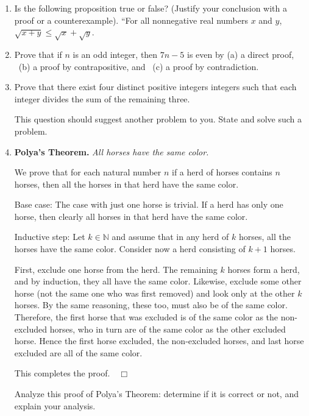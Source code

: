 \documentclass[12pt]{article}
\newcommand{\NN}{{\mathbb N}}  %
\begin{document}
\begin{enumerate}
 \item Is the following proposition true or false?  (Justify your conclusion with a proof or a counterexample).\newline
   ``For all nonnegative real numbers $x$ and $y$, $\sqrt{x+y}\leq\sqrt{x}+\sqrt{y}$.



 \item Prove that if $n$ is an odd integer, then $7n-5$ is even by\newline
   (a) a direct proof, \
   (b) a proof by contrapositive,  and \ 
   (c) a proof by contradiction.


 \item Prove that there exist four distinct positive integers integers such that each  integer divides the sum of the remaining three.

   This question should suggest another problem to you.
   State and solve such a problem.

\item {\color{Maroon}\bf Polya's Theorem.}  {\color{RoyalPurple}\sl All horses have the same color.}

  We prove that for each natural number $n$ if a herd of horses contains $n$ horses, then all the horses in that herd have the
  same color.

  {\color{Maroon}\sf Base case:}
   The case with just one horse is trivial. If a herd has only one horse, then clearly all horses in that herd have the same color.


   {\color{Maroon}\sf Inductive step:}
   Let $k\in \NN$ and assume that in any herd of $k$ horses, all the horses have the same color.
   Consider now a herd consisting of $k{+}1$ horses.

   First, exclude one horse from the herd.  The remaining $k$ horses form a herd, and by induction, they all have the same
   color.
   Likewise, exclude some other horse (not the same one who was first removed) and look only at the other $k$ horses.
   By the same reasoning, these too, must also be of the same color. Therefore, the first horse that was excluded is of the
   same color as the non-excluded horses, who in turn are of the same color as the other excluded horse. Hence the first
   horse excluded, the non-excluded horses, and last horse excluded are all of the same color.

   This completes the proof.\ \ $\Box$\bigskip

   {\color{blue}Analyze this proof of Polya's Theorem: determine if it is correct or not, and explain your analysis.}

\end{enumerate}
\end{document}
